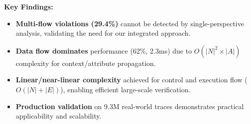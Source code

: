 \begin{table}[t]
\textbf{Key Findings:}
\begin{itemize}[leftmargin=*, noitemsep, topsep=2pt]
    \item \textbf{Multi-flow violations (29.4\%)} cannot be detected by single-perspective analysis, validating the need for our integrated approach.
    \item \textbf{Data flow dominates} performance (62\%, 2.3ms) due to $O(|N|^2 \times |A|)$ complexity for context/attribute propagation.
    \item \textbf{Linear/near-linear complexity} achieved for control and execution flow ($O(|N|+|E|)$), enabling efficient large-scale verification.
    \item \textbf{Production validation} on 9.3M real-world traces demonstrates practical applicability and scalability.
\end{itemize}
\end{table}

